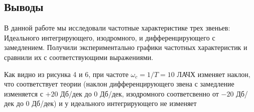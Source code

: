 \documentclass[a4paper, 12pt]{article}
\begin{document}
\newpage
\begin{center}
	\section*{Выводы}
\end{center}

В данной работе мы исследовали частотные характеристике трех звеньев: Идеального интегрирующего, изодромного, и дифференцирующего с замедлением. Получили экспериментально графики частотных характеристик и сравнили их с соответствующими выражениями. \par
Как видно из рисунка 4 и 6, при частоте $\omega_c = 1/T = 10$ ЛАЧХ изменяет наклон, что соответствует теории (наклон дифференцирующего звена с замедление изменяется с $+20$ Дб/дек до $0$ Дб/дек, изодромного соответсвенно от $-20$ Дб/дек до $0$ Дб/дек) и у идеального интегрирующего не изменяет
\end{document}
